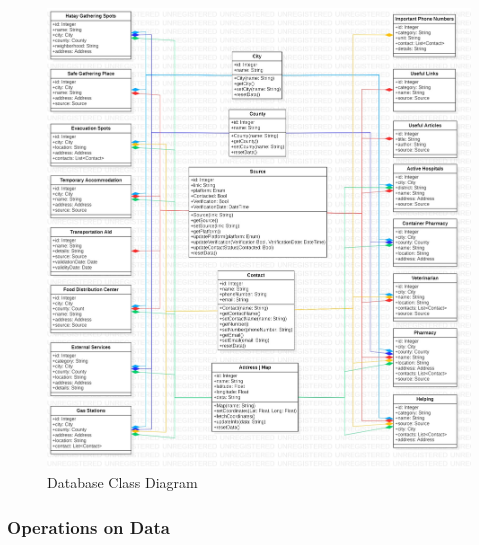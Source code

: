 \begin{figure}[H]
  \centering
  \includegraphics[width=\linewidth]{img/database-class-diagram.jpg}
  \caption{Database Class Diagram}
\end{figure}

\vspace*{\fill}
\newpage

\subsubsection{Operations on Data}

